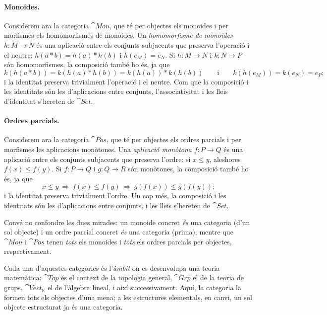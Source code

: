 \paragraph{Monoides.}
Considerem ara la categoria $\cat{Mon}$, que té per objectes els monoides i per morfismes els homomorfismes de monoides. Un \emph{homomorfisme de monoides} $h\colon M\to N$ és una aplicació entre els conjunts subjacents que preserva l'operació i el neutre: $h(a\ast b)=h(a)\ast h(b)$ i $h(e_M)=e_N$. Si $h\colon M\to N$ i $k\colon N\to P$ són homomorfismes, la composició també ho és, ja que
\[
k(h(a\ast b))=k(h(a)\ast h(b))=k(h(a))\ast k(h(b))\qquad\text{i}\qquad k(h(e_M))=k(e_N)=e_P;
\]
i la identitat preserva trivialment l'operació i el neutre. Com que la composició i les identitats són les d'aplicacions entre conjunts, l'associativitat i les lleis d'identitat s'hereten de $\cat{Set}$.

\paragraph{Ordres parcials.}
Considerem ara la categoria $\cat{Pos}$, que té per objectes els ordres parcials i per morfismes les aplicacions monòtones. Una \emph{aplicació monòtona} $f\colon P\to Q$ és una aplicació entre els conjunts subjacents que preserva l'ordre: si $x\le y$, aleshores $f(x)\le f(y)$. Si $f\colon P\to Q$ i $g\colon Q\to R$ són monòtones, la composició també ho és, ja que
\[
x\le y \ \Longrightarrow\ f(x)\le f(y) \ \Longrightarrow\ g(f(x))\le g(f(y));
\]
i la identitat preserva trivialment l'ordre. Un cop més, la composició i les identitats són les d'aplicacions entre conjunts, i les lleis s'hereten de $\cat{Set}$.

Convé no confondre les dues mirades: un monoide concret \emph{és} una categoria (d'un sol objecte) i un ordre parcial concret \emph{és} una categoria (prima), mentre que $\cat{Mon}$ i $\cat{Pos}$ tenen \emph{tots} els monoides i \emph{tots} els ordres parcials per objectes, respectivament.

\begin{observacio}
Cada una d'aquestes categories és l'\emph{àmbit} on es desenvolupa una teoria matemàtica: $\cat{Top}$ és el context de la topologia general, $\cat{Grp}$ el de la teoria de grups, $\cat{Vect}_{\mathbb K}$ el de l'àlgebra lineal, i així successivament. Aquí, la categoria la formen tots els objectes d'una mena; a les estructures elementals, en canvi, un sol objecte estructurat ja és una categoria.
\end{observacio}

